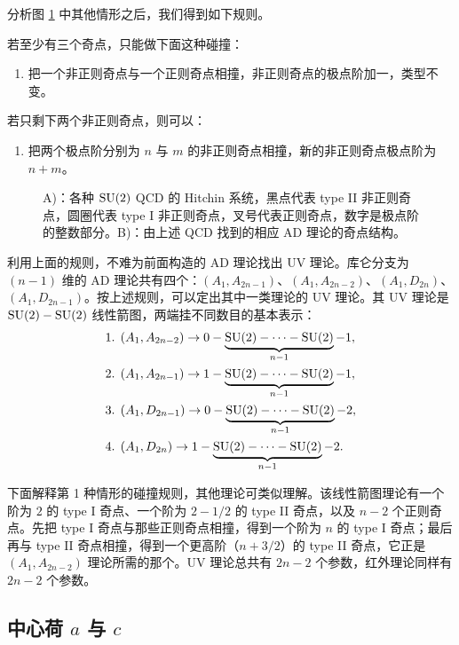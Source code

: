 分析图 \ref{fig:5} 中其他情形之后，我们得到如下规则。

若至少有三个奇点，只能做下面这种碰撞：
\begin{enumerate}[label=\textup{\alph*.}]
  \item 把一个非正则奇点与一个正则奇点相撞，非正则奇点的极点阶加一，类型不变。
\end{enumerate}
若只剩下两个非正则奇点，则可以：
\begin{enumerate}[label=\textup{\alph*.},start=2]
  \item 把两个极点阶分别为 $n$ 与 $m$ 的非正则奇点相撞，新的非正则奇点极点阶为 $n+m$。
\end{enumerate}

\begin{figure}[tbp]
\centering

\caption{A)：各种 $\operatorname{SU}(2)$ QCD 的 Hitchin 系统，黑点代表 type II 非正则奇点，圆圈代表 type I 非正则奇点，叉号代表正则奇点，数字是极点阶的整数部分。B)：由上述 QCD 找到的相应 AD 理论的奇点结构。}
\label{fig:5}
\end{figure}

利用上面的规则，不难为前面构造的 AD 理论找出 UV 理论。库仑分支为 $(n-1)$ 维的 AD 理论共有四个：$(A_1,A_{2n-1})$、$(A_1,A_{2n-2})$、$(A_1,D_{2n})$、$(A_1,D_{2n-1})$。按上述规则，可以定出其中一类理论的 UV 理论。其 UV 理论是 $\operatorname{SU}(2)-\operatorname{SU}(2)$ 线性箭图，两端挂不同数目的基本表示：
\begin{align}
\text{1. } &(A_1,A_{2n-2}) \to 0 - \underbrace{\operatorname{SU}(2)-\cdots-\operatorname{SU}(2)}_{n-1} - 1 ,\notag\\
\text{2. } &(A_1,A_{2n-1}) \to 1 - \underbrace{\operatorname{SU}(2)-\cdots-\operatorname{SU}(2)}_{n-1} - 1 ,\notag\\
\text{3. } &(A_1,D_{2n-1}) \to 0 - \underbrace{\operatorname{SU}(2)-\cdots-\operatorname{SU}(2)}_{n-1} - 2 ,\notag\\
\text{4. } &(A_1,D_{2n})   \to 1 - \underbrace{\operatorname{SU}(2)-\cdots-\operatorname{SU}(2)}_{n-1} - 2 .
\end{align}

下面解释第 1 种情形的碰撞规则，其他理论可类似理解。该线性箭图理论有一个阶为 $2$ 的 type I 奇点、一个阶为 $2-1/2$ 的 type II 奇点，以及 $n-2$ 个正则奇点。先把 type I 奇点与那些正则奇点相撞，得到一个阶为 $n$ 的 type I 奇点；最后再与 type II 奇点相撞，得到一个更高阶（$n+3/2$）的 type II 奇点，它正是 $(A_1,A_{2n-2})$ 理论所需的那个。UV 理论总共有 $2n-2$ 个参数，红外理论同样有 $2n-2$ 个参数。

\subsection{中心荷 $a$ 与 $c$}
\label{sec:4.4}

